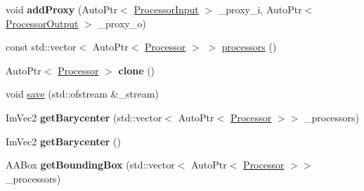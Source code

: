 \begin{DoxyCompactItemize}
\item 
\mbox{\label{class_chill_1_1_processing_graph_ab870a61bcd6d90c2dde3bd06305b8f81}} 
void {\bfseries add\+Proxy} (Auto\+Ptr$<$ \mbox{\hyperlink{class_chill_1_1_processor_input}{Processor\+Input}} $>$ \+\_\+proxy\+\_\+i, Auto\+Ptr$<$ \mbox{\hyperlink{class_chill_1_1_processor_output}{Processor\+Output}} $>$ \+\_\+proxy\+\_\+o)
\item 
const std\+::vector$<$ Auto\+Ptr$<$ \mbox{\hyperlink{class_chill_1_1_processor}{Processor}} $>$ $>$ \mbox{\hyperlink{class_chill_1_1_processing_graph_a5a999e6f0f2af8d67e2c3d0afb393707}{processors}} ()
\item 
\mbox{\label{class_chill_1_1_processing_graph_aa3b30207dcfbe5271a55ac7349bb9a36}} 
Auto\+Ptr$<$ \mbox{\hyperlink{class_chill_1_1_processor}{Processor}} $>$ {\bfseries clone} ()
\item 
void \mbox{\hyperlink{class_chill_1_1_processing_graph_a15ebc74e61a5bbdba8715c8d93b2815d}{save}} (std\+::ofstream \&\+\_\+stream)
\item 
\mbox{\label{class_chill_1_1_processing_graph_a35a0eb123e8bfc04838377a4c02d9d71}} 
Im\+Vec2 {\bfseries get\+Barycenter} (std\+::vector$<$ Auto\+Ptr$<$ \mbox{\hyperlink{class_chill_1_1_processor}{Processor}} $>$$>$ \+\_\+processors)
\item 
\mbox{\label{class_chill_1_1_processing_graph_a8e2059c2764aa879d831ff9d437cd532}} 
Im\+Vec2 {\bfseries get\+Barycenter} ()
\item 
\mbox{\label{class_chill_1_1_processing_graph_a07394d72254516ed9250516f921ce02b}} 
A\+A\+Box {\bfseries get\+Bounding\+Box} (std\+::vector$<$ Auto\+Ptr$<$ \mbox{\hyperlink{class_chill_1_1_processor}{Processor}} $>$$>$ \+\_\+processors)
\end{DoxyCompactItemize}
